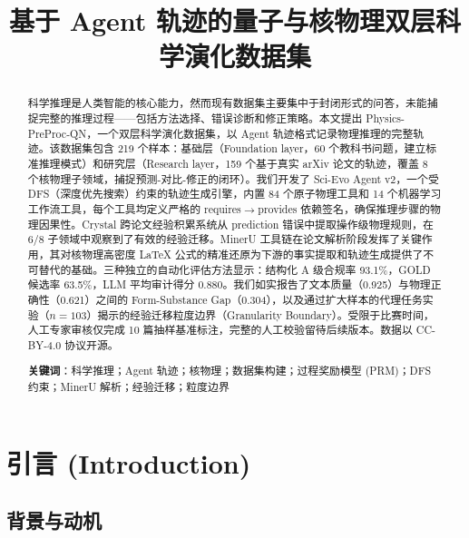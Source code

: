 \documentclass[12pt,a4paper]{article}
\title{\textbf{基于 Agent 轨迹的量子与核物理双层科学演化数据集}}
\begin{document}
\maketitle

\begin{abstract}
\noindent

科学推理是人类智能的核心能力，然而现有数据集主要集中于封闭形式的问答，未能捕捉完整的推理过程——包括方法选择、错误诊断和修正策略。本文提出 Physics-PreProc-QN，一个双层科学演化数据集，以 Agent 轨迹格式记录物理推理的完整轨迹。该数据集包含 219 个样本：基础层（Foundation layer，60 个教科书问题，建立标准推理模式）和研究层（Research layer，159 个基于真实 arXiv 论文的轨迹，覆盖 8 个核物理子领域，捕捉预测-对比-修正的闭环）。我们开发了 Sci-Evo Agent v2，一个受 DFS（深度优先搜索）约束的轨迹生成引擎，内置 84 个原子物理工具和 14 个机器学习工作流工具，每个工具均定义严格的 requires$\rightarrow$provides 依赖签名，确保推理步骤的物理因果性。Crystal 跨论文经验积累系统从 prediction 错误中提取操作级物理规则，在 6/8 子领域中观察到了有效的经验迁移。MinerU 工具链在论文解析阶段发挥了关键作用，其对核物理高密度 LaTeX 公式的精准还原为下游的事实提取和轨迹生成提供了不可替代的基础。三种独立的自动化评估方法显示：结构化 A 级合规率 93.1\%，GOLD 候选率 63.5\%，LLM 平均审计得分 0.880。我们如实报告了文本质量（0.925）与物理正确性（0.621）之间的 Form-Substance Gap（0.304），以及通过扩大样本的代理任务实验（$n=103$）揭示的经验迁移粒度边界（Granularity Boundary）。受限于比赛时间，人工专家审核仅完成 10 篇抽样基准标注，完整的人工校验留待后续版本。数据以 CC-BY-4.0 协议开源。

\vspace{0.5cm}
\noindent\textbf{关键词}：科学推理；Agent 轨迹；核物理；数据集构建；过程奖励模型 (PRM)；DFS 约束；MinerU 解析；经验迁移；粒度边界
\end{abstract}

\setcounter{tocdepth}{2}
\tableofcontents
\newpage

\vspace{0.5cm}


\section{引言 (Introduction)}

\subsection{背景与动机}
\end{document}
